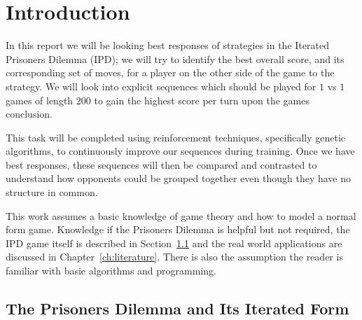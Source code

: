 
\chapter{Introduction}\label{ch:intro}
In this report we will be looking best responses of strategies in the Iterated Prisoners Dilemma (IPD);
we will try to identify the best overall score, and its corresponding set of moves, for a player on the other side of the game to the strategy.
We will look into explicit sequences which should be played for $1$ vs $1$ games of length 200 to gain the highest score per turn upon the games conclusion.

This task will be completed using reinforcement techniques, specifically genetic algorithms, to continuously improve our sequences during training. Once we have best responses, these sequences will then be compared and contrasted to understand how opponents could be grouped together even though they have no structure in common.

This work assumes a basic knowledge of game theory and how to model a normal form game.
Knowledge if the Prisoners Dilemma is helpful but not required, the IPD game itself is described in Section~\ref{sec:iteratedPrisonersDilemma} and the real world applications are discussed in Chapter~\ref{ch:literature}.
There is also the assumption the reader is familiar with basic algorithms and programming.

\section{The Prisoners Dilemma and Its Iterated Form}\label{sec:iteratedPrisonersDilemma}

